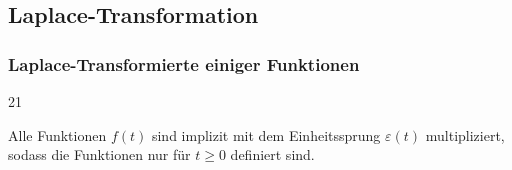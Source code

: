 
\subsection{Laplace-Transformation}
\label{Laplace-Transformation}


\subsubsection{Laplace-Transformierte einiger Funktionen}{21}
\label{Laplace-Transformierte einger Funktionen}

Alle Funktionen $f(t)$ sind implizit mit dem Einheitssprung $\varepsilon(t)$ multipliziert, sodass die Funktionen nur
für $t \geq 0$ definiert sind.

\vspace{0.2cm}

